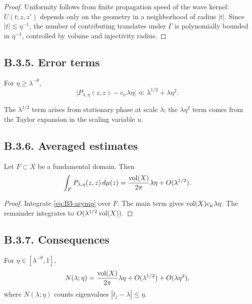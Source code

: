 \begin{proof}
Uniformity follows from finite propagation speed of the wave kernel: $U(t;z,z')$ depends only on the geometry in a neighborhood of radius $|t|$.
Since $|t|\lesssim \eta^{-1}$, the number of contributing translates under $\Gamma$ is polynomially bounded in $\eta^{-1}$, controlled by volume and injectivity radius.
\end{proof}

\subsection*{B.3.5. Error terms}

\begin{lemma}\label{lem:B3-error}
For $\eta\ge \lambda^{-\theta}$,
\[
\big|P_{\lambda,\eta}(z,z)-c_\psi\lambda\eta\big|
\ll \lambda^{1/2}+\lambda\eta^2.
\]
\end{lemma}

\begin{remark}
The $\lambda^{1/2}$ term arises from stationary phase at scale $\lambda$;
the $\lambda\eta^2$ term comes from the Taylor expansion in the scaling variable $u$.
\end{remark}

\subsection*{B.3.6. Averaged estimates}

\begin{proposition}\label{prop:B3-int}
Let $F\subset X$ be a fundamental domain.
Then
\[
\int_F P_{\lambda,\eta}(z,z)\,d\mu(z)=\frac{\operatorname{vol}(X)}{2\pi}\lambda\eta+O(\lambda^{1/2}).
\]
\end{proposition}

\begin{proof}
Integrate \eqref{eq:B3-asymp} over $F$.
The main term gives $\operatorname{vol}(X)c_\psi\lambda\eta$.
The remainder integrates to $O(\lambda^{1/2}\operatorname{vol}(X))$.
\end{proof}

\subsection*{B.3.7. Consequences}

\begin{corollary}\label{cor:B3-weyl}
For $\eta\in[\lambda^{-\theta},1]$,
\[
N(\lambda;\eta)=\frac{\operatorname{vol}(X)}{2\pi}\lambda\eta+O(\lambda^{1/2})+O(\lambda\eta^2),
\]
where $N(\lambda;\eta)$ counts eigenvalues $|t_j-\lambda|\le \eta$.
\end{corollary}

